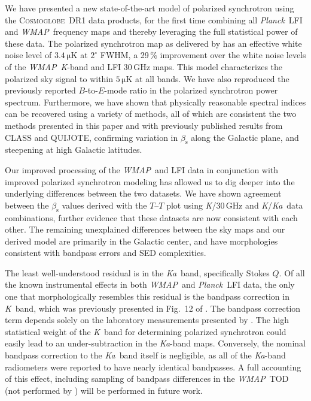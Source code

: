\documentclass[twocolumn]{../../common/aa}
\def\WMAP{\emph{WMAP}}
\def\Planck{\emph{Planck}}
\newcommand{\cosmoglobe}{\textsc{Cosmoglobe}}
\newcommand{\K}[0]{\textit K}
\newcommand{\Ka}[0]{\textit{Ka}}
\begin{document}
We have presented a new state-of-the-art model of polarized synchrotron using the \cosmoglobe\ DR1 data products, for the first time combining all \Planck\ LFI and \WMAP\ frequency maps and thereby leveraging the full statistical power of these data. The polarized synchrotron map as delivered by \citet{watts2023_dr1} has an effective white noise level of $3.4\,\mathrm{\mu K}$ at $2^\circ$ FWHM, a 29\,\% improvement over the white noise levels of the \WMAP\ \K-band and LFI 30\,GHz maps. This model characterizes the polarized sky signal to within $5\,\mathrm{\mu K}$ at all bands. We have also reproduced the previously reported $B$-to-$E$-mode ratio in the polarized synchrotron power spectrum. Furthermore, we have shown that physically reasonable spectral indices can be recovered using a variety of methods, all of which are consistent the two methods presented in this paper and with previously published results from CLASS and QUIJOTE, confirming variation in $\beta_\mathrm s$ along the Galactic plane, and steepening at high Galactic latitudes.


Our improved processing of the \WMAP\ and LFI data in conjunction with improved polarized synchrotron modeling has allowed us to dig deeper into the underlying differences between the two datasets. We have shown agreement between the $\beta_\mathrm s$ values derived with the $T$--$T$ plot using \K/30\,GHz and \K/\Ka\ data combinations, further evidence that these datasets are now consistent with each other. The remaining unexplained differences between the sky maps and our derived model are primarily in the Galactic center, and have morphologies consistent with bandpass errors and SED complexities.


The least well-understood residual is in the \Ka\ band, specifically Stokes $Q$. Of all the known instrumental effects in both \WMAP\ and \Planck\ LFI data, the only one that morphologically resembles this residual is the bandpass correction in \K\ band, which was previously presented in Fig.~12 of \citet{watts2023_dr1}. The bandpass correction term depends solely on the laboratory measurements presented by \citet{jarosik2003:MAP}. The high statistical weight of the \K\ band for determining polarized synchrotron could easily lead to an under-subtraction in the \Ka-band maps. Conversely, the nominal bandpass correction to the \Ka\ band itself is negligible, as all of the \Ka-band radiometers were reported to have nearly identical bandpasses. A full accounting of this effect, including sampling of bandpass differences in the \WMAP\ TOD (not performed by \citealt{watts2023_dr1}) will be performed in future work.
\end{document}
